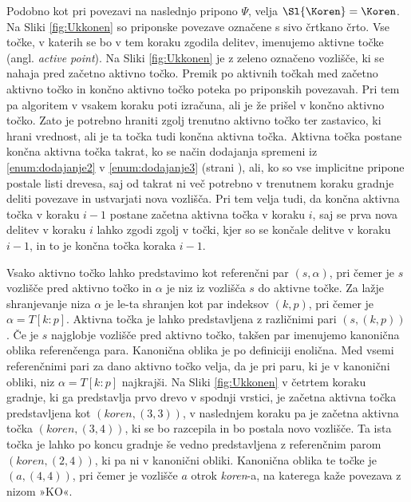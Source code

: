 Podobno kot pri povezavi na naslednjo pripono $\Psi$, velja $\Sl{\Koren}=\Koren$. Na Sliki \ref{fig:Ukkonen} so priponske povezave označene s sivo črtkano črto. Vse točke, v katerih se bo v tem koraku zgodila delitev, imenujemo aktivne točke (angl. \textit{active point}).  Na Sliki \ref{fig:Ukkonen} je z zeleno označeno vozlišče, ki se nahaja pred začetno aktivno točko. Premik po aktivnih točkah med začetno aktivno točko in končno aktivno točko poteka po priponskih povezavah. Pri tem pa algoritem v vsakem koraku poti izračuna, ali je že prišel v končno aktivno točko. Zato je potrebno hraniti zgolj trenutno aktivno točko ter zastavico, ki hrani vrednost, ali je ta točka tudi končna aktivna točka. Aktivna točka postane končna aktivna točka takrat, ko se način dodajanja spremeni iz \ref{enum:dodajanje2} v \ref{enum:dodajanje3} (strani \pageref{par:naciniDodajanja}), ali, ko so vse implicitne pripone postale listi drevesa, saj od takrat ni več potrebno v trenutnem koraku gradnje deliti povezave in ustvarjati nova vozlišča. Pri tem velja tudi, da končna aktivna točka v koraku $i-1$ postane začetna aktivna točka v koraku $i$, saj se prva nova delitev v koraku $i$ lahko zgodi zgolj v točki, kjer so se končale delitve v koraku $i-1$, in to je končna točka koraka $i-1$. 

Vsako aktivno točko lahko predstavimo kot referenčni par $(s,\alpha)$, pri čemer je $s$ vozlišče pred aktivno točko in $\alpha$ je niz iz vozlišča $s$ do aktivne točke. Za lažje shranjevanje niza $\alpha$ je le-ta shranjen kot par indeksov $(k,p)$, pri čemer je $\alpha=T[k:p]$. Aktivna točka je lahko predstavljena z različnimi pari $(s, (k,p))$. Če je $s$  najglobje vozlišče pred aktivno točko, takšen par imenujemo kanonična oblika referenčenga para. Kanonična oblika je po definiciji enolična. Med vsemi referenčnimi pari za dano aktivno točko velja, da je pri paru, ki je v kanonični obliki, niz $\alpha=T[k:p]$ najkrajši. Na Sliki \ref{fig:Ukkonen} v četrtem koraku gradnje, ki ga predstavlja prvo drevo v spodnji vrstici, je začetna aktivna točka predstavljena kot $(\textit{koren},(3,3))$, v naslednjem koraku pa je začetna aktivna točka $(\textit{koren},(3,4))$, ki se bo razcepila in bo postala novo vozlišče. Ta ista točka je lahko po koncu gradnje še vedno predstavljena z referenčnim parom $(\textit{koren},(2,4))$, ki pa ni v kanonični obliki. Kanonična oblika te točke je $(a,(4,4))$, pri čemer je vozlišče $a$ otrok \textit{koren}-a, na katerega kaže povezava z nizom »KO«.

